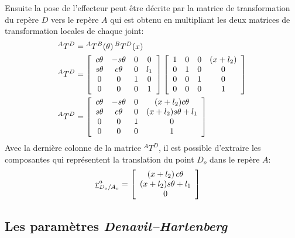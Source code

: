 Ensuite la pose de l'effecteur peut être décrite par la matrice de transformation du repère $D$ vers le repère $A$ qui est obtenu en multipliant les deux matrices de transformation locales de chaque joint:
\begin{align}
{}^AT^D &=  {}^AT^B(\theta) \, {}^BT^D(x) \\
{}^AT^D &=  
\left[ \begin{array}{c c c c} 
  c\theta & -s\theta & 0 & 0  \\
	s\theta & c\theta  & 0 & l_1  \\
	0 & 0 & 1              & 0  \\ 
	0 & 0 & 0              & 1
\end{array} \right]
\left[ \begin{array}{c c c c} 
  1 & 0 & 0 & (x + l_2)  \\
	0 & 1 & 0 & 0  \\
	0 & 0 & 1 & 0  \\ 
	0 & 0 & 0 & 1
\end{array} \right] \\
{}^AT^D &=  
\left[ \begin{array}{c c c c} 
  c\theta & -s\theta & 0 & (x + l_2) c\theta  \\
	s\theta & c\theta  & 0 & (x + l_2) s\theta + l_1   \\
	0 & 0 & 1              & 0  \\ 
	0 & 0 & 0              & 1
\end{array} \right]
\end{align} 
Avec la dernière colonne de la matrice ${}^AT^D$, il est possible d'extraire les composantes qui représentent la translation du point $D_o$ dans le repère $A$:
\begin{align}
\underline{r}_{D_o/A_o}^a   &=  \left[ \begin{array}{c} 
( x + l_2 ) \, c\theta \\ ( x + l_2 ) s\theta  + l_1 \\ 0
\end{array} \right] 
\end{align} 

\newpage
\subsection{Les paramètres \textit{Denavit–Hartenberg}}

